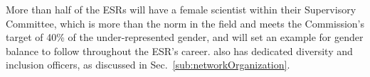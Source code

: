 
More than half of the ESRs will have a female scientist within their Supervisory Committee, which is more than the norm in the field and meets the Commission's target of 40\% of the under-represented gender, and will set an example for gender balance to follow throughout the ESR's career. \acronym also has dedicated diversity and inclusion officers, as discussed in Sec.~\ref{sub:networkOrganization}. 
